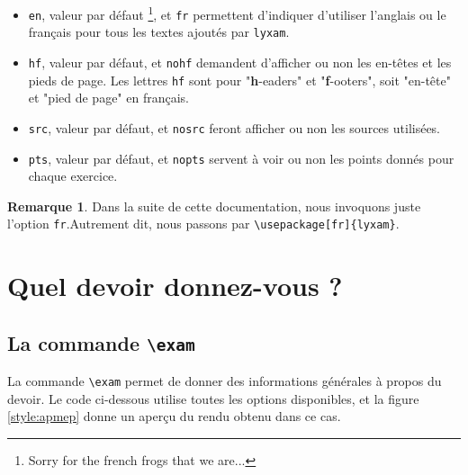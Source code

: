 \documentclass[12pt,a4paper]{scrartcl}
\theoremstyle{definition}
\newtheorem*{remark}{Remarque}
\begin{document}
\begin{itemize}[label=\textbullet]

	\item \verb+en+, valeur par défaut
	\footnote{
		Sorry for the french frogs that we are...
	}, et \verb+fr+ permettent d'indiquer d'utiliser l'anglais ou le français pour tous les textes ajoutés par \verb+lyxam+.

	\item \verb+hf+, valeur par défaut, et \verb+nohf+ demandent d'afficher ou non les en-têtes et les pieds de page.
	Les lettres \verb+hf+ sont pour "\textbf{h}-eaders" et "\textbf{f}-ooters", soit "en-tête" et "pied de page" en français.

	\item \verb+src+, valeur par défaut, et \verb+nosrc+ feront afficher ou non les sources utilisées.

	\item \verb+pts+, valeur par défaut, et \verb+nopts+ servent à voir ou non les points donnés pour chaque exercice.
\end{itemize}

\begin{remark}
	Dans la suite de cette documentation, nous invoquons juste l'option \verb+fr+.Autrement dit, nous passons par \verb+\usepackage[fr]{lyxam}+.
\end{remark}




\section{Quel devoir donnez-vous ?}

	\subsection{La commande \texttt{\textbackslash exam}}

La commande \verb+\exam+ permet de donner des informations générales à propos du devoir. 
Le code ci-dessous utilise toutes les options disponibles, et la figure \ref{style:apmep}  donne un aperçu du rendu obtenu dans ce cas. 
\end{document}
